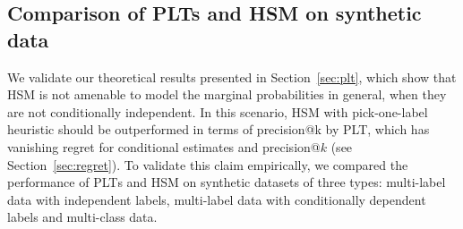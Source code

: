 \documentclass{article}
\newcommand{\Algo}[1]{\textsc{#1}}
\begin{document}
{%

\subsection{Comparison of PLTs and HSM on synthetic data}
\label{sec:empirical-synthetic}



We validate our theoretical results presented in Section~\ref{sec:plt}, which show that  \Algo{HSM} is not amenable to model the marginal probabilities in general, when they are not conditionally independent. In this scenario, \Algo{HSM} with pick-one-label heuristic should be outperformed in terms of precision@k by \Algo{PLT}, which has vanishing regret for conditional estimates and precision@$k$ (see Section~\ref{sec:regret}). To validate this claim empirically, we compared the performance of \Algo{PLT}s and \Algo{HSM} on synthetic datasets of three types: multi-label data with independent labels, multi-label data with conditionally dependent labels and multi-class data. 

}
\end{document}
